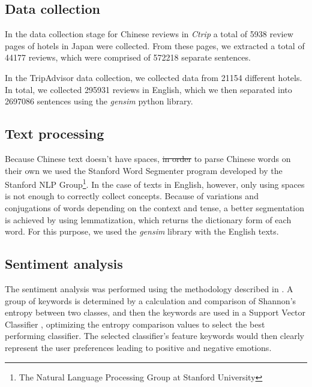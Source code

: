 \documentclass[review]{elsarticle}
\providecommand{\DIFdel}[1]{{\protect\color{red}\sout{#1}}}                      %
\providecommand{\DIFdelbegin}{} %
\providecommand{\DIFdelend}{} %
\newcommand{\DIFscaledelfig}{0.5}
\newlength{\DIFdelgraphicswidth} %
\newlength{\DIFdelgraphicsheight} %
\newcommand{\DIFdelincludegraphics}[2][]{%
\sbox{\DIFdelgraphicsbox}{\DIFOincludegraphics[#1]{#2}}%
\settoboxwidth{\DIFdelgraphicswidth}{\DIFdelgraphicsbox} %
\settoboxtotalheight{\DIFdelgraphicsheight}{\DIFdelgraphicsbox} %
\scalebox{\DIFscaledelfig}{%
\parbox[b]{\DIFdelgraphicswidth}{\usebox{\DIFdelgraphicsbox}\\[-\baselineskip] \rule{\DIFdelgraphicswidth}{0em}}\llap{\resizebox{\DIFdelgraphicswidth}{\DIFdelgraphicsheight}{%
\setlength{\unitlength}{\DIFdelgraphicswidth}%
\begin{picture}(1,1)%
\thicklines\linethickness{2pt} %
{\color[rgb]{1,0,0}\put(0,0){\framebox(1,1){}}}%
{\color[rgb]{1,0,0}\put(0,0){\line( 1,1){1}}}%
{\color[rgb]{1,0,0}\put(0,1){\line(1,-1){1}}}%
\end{picture}%
}\hspace*{3pt}}} %
} %
\DeclareRobustCommand{\DIFdelbegin}{\DIFOdelbegin \let\includegraphics\DIFdelincludegraphics} %
\DeclareRobustCommand{\DIFdelend}{\DIFOaddend \let\includegraphics\DIFOincludegraphics} %
\begin{document}
\subsection{Data collection}\label{datacollection}

In the data collection stage for Chinese reviews in \textit{Ctrip} a total of \num[group-separator={,}]{5938} review pages of hotels in Japan were collected. From these pages, we extracted a total of \num[group-separator={,}]{44177} reviews, which were comprised of \num[group-separator={,}]{572218} separate sentences. 


In the TripAdvisor data collection, we collected data from \num[group-separator={,}]{21154} different hotels. In total, we collected \num[group-separator={,}]{295931} reviews in English, which we then separated into \num[group-separator={,}]{2697086} sentences using the \textit{gensim} python library. 

\subsection{Text processing}\label{textprocessing}

Because Chinese text doesn't have spaces, \DIFdelbegin \DIFdel{in order }\DIFdelend to parse Chinese words on their own we used the Stanford Word Segmenter \cite[][]{chang2008} program developed by the Stanford NLP Group\footnote{\label{stanfordnlp}The Natural Language Processing Group at Stanford University}. In the case of texts in English, however, only using spaces is not enough to correctly collect concepts. Because of variations and conjugations of words depending on the context and tense, a better segmentation is achieved by using lemmatization, which returns the dictionary form of each word. For this purpose, we used the \textit{gensim} library with the English texts.

\subsection{Sentiment analysis}\label{sentimentanalysis}

The sentiment analysis was performed using the methodology described in \cite{Aleman2018ICAROB}. A group of keywords is determined by a calculation and comparison of Shannon's entropy \cite[][]{shannon1948} between two classes, and then the keywords are used in a Support Vector Classifier \cite[][]{cortes1995}, optimizing the entropy comparison values to select the best performing classifier. The selected classifier's feature keywords would then clearly represent the user preferences leading to positive and negative emotions.
\end{document}
